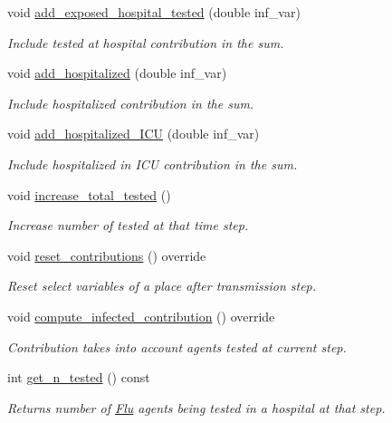 \begin{DoxyCompactItemize}
void \hyperlink{classHospital_a278812e4a6436ab49badb9e26a81be3f}{add\+\_\+exposed\+\_\+hospital\+\_\+tested} (double inf\+\_\+var)
\begin{DoxyCompactList}\small\item\em Include tested at hospital contribution in the sum. \end{DoxyCompactList}\item 
void \hyperlink{classHospital_a568e499510d128da61f39f3983fa20a8}{add\+\_\+hospitalized} (double inf\+\_\+var)
\begin{DoxyCompactList}\small\item\em Include hospitalized contribution in the sum. \end{DoxyCompactList}\item 
void \hyperlink{classHospital_a5a59a3e88cd740b32c8829f31a51f47c}{add\+\_\+hospitalized\+\_\+\+I\+CU} (double inf\+\_\+var)
\begin{DoxyCompactList}\small\item\em Include hospitalized in I\+CU contribution in the sum. \end{DoxyCompactList}\item 
void \hyperlink{classHospital_a2661ef21ce8561a28849d1be40e2ee50}{increase\+\_\+total\+\_\+tested} ()
\begin{DoxyCompactList}\small\item\em Increase number of tested at that time step. \end{DoxyCompactList}\item 
void \hyperlink{classHospital_a928d185dde78d0bce3034b7a138b472d}{reset\+\_\+contributions} () override
\begin{DoxyCompactList}\small\item\em Reset select variables of a place after transmission step. \end{DoxyCompactList}\item 
void \hyperlink{classHospital_ad87fc4a53e50a35489c9024892a7c9d6}{compute\+\_\+infected\+\_\+contribution} () override
\begin{DoxyCompactList}\small\item\em Contribution takes into account agents tested at current step. \end{DoxyCompactList}\item 
int \hyperlink{classHospital_ab7c68212de4e44986c8de732af160221}{get\+\_\+n\+\_\+tested} () const
\begin{DoxyCompactList}\small\item\em Returns number of \hyperlink{classFlu}{Flu} agents being tested in a hospital at that step. \end{DoxyCompactList}\item 

\end{DoxyCompactItemize}
